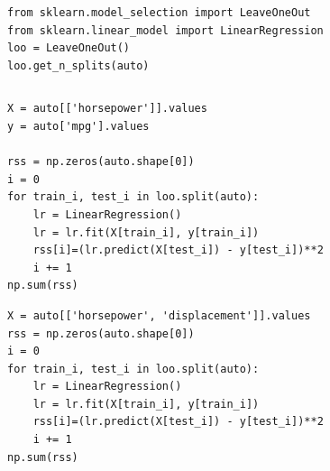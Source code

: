 

\begin{frame}[fragile]
\tiny
\begin{lstlisting}
from sklearn.model_selection import LeaveOneOut
from sklearn.linear_model import LinearRegression
loo = LeaveOneOut()
loo.get_n_splits(auto)
\end{lstlisting}
\begin{lstlisting}
\end{lstlisting}
\end{frame}


\begin{frame}[fragile]
\tiny
\begin{lstlisting}
X = auto[['horsepower']].values
y = auto['mpg'].values

rss = np.zeros(auto.shape[0])
i = 0
for train_i, test_i in loo.split(auto):
    lr = LinearRegression() 
    lr = lr.fit(X[train_i], y[train_i])
    rss[i]=(lr.predict(X[test_i]) - y[test_i])**2
    i += 1
np.sum(rss)\end{lstlisting}
\end{frame}

\begin{frame}[fragile]
\tiny
\begin{lstlisting}
X = auto[['horsepower', 'displacement']].values
rss = np.zeros(auto.shape[0])
i = 0
for train_i, test_i in loo.split(auto):
    lr = LinearRegression() 
    lr = lr.fit(X[train_i], y[train_i])
    rss[i]=(lr.predict(X[test_i]) - y[test_i])**2
    i += 1
np.sum(rss)
\end{lstlisting}
\end{frame}


